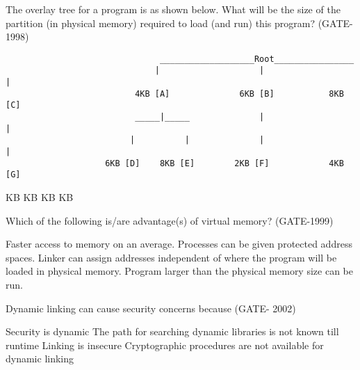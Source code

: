 
\begin{questyle}

  \question  The overlay tree for a program is as shown below. What will be the size of the partition (in physical memory)
             required to load (and run) this program?  (GATE-1998)
             \begin{lstlisting}
                               ___________________Root________________
                              |                    |                  |
                          4KB [A]              6KB [B]           8KB [C]
                          _____|_____              |                  |
                         |          |              |                  |
                    6KB [D]    8KB [E]        2KB [F]            4KB [G]
              \end{lstlisting}
  \begin{choices}
     KB
     KB
     KB
     KB
  \end{choices}

\end{questyle}


\begin{questyle}

  \question  Which of the following is/are advantage(s) of virtual memory? (GATE-1999)

  \begin{choices}
    \choice Faster access to memory on an average.
    \choice Processes can be given protected address spaces.
    \choice Linker can assign addresses independent of where the program will be loaded in physical memory.
    \choice Program larger than the physical memory size can be run.
  \end{choices}

\end{questyle}


\begin{questyle}

  \question  Dynamic linking can cause security concerns because (GATE- 2002)

  \begin{choices}
    \choice Security is dynamic
    \correctchoice The path for searching dynamic libraries is not known till runtime
    \choice Linking is insecure
    \choice Cryptographic procedures are not available for dynamic linking
  \end{choices}

\end{questyle}

